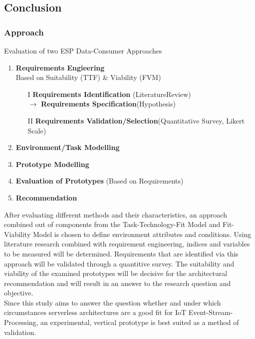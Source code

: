 \begin{minipage}{\textwidth}
    \subsection{Conclusion}
    
    \subsubsection{Approach}
    Evaluation of two ESP Data-Consumer Approaches
    \begin{enumerate}
        \item \textbf{Requirements Engieering}\\
            Based on Suitability (TTF) \& Viability (FVM)
            \begin{enumerate}
                \item[I] \textbf{Requirements Identification} (LiteratureReview)\\
                    $\longrightarrow$ \textbf{Requirements Specification}(Hypothesis)
                \item[II] \textbf{Requirements Validation/Selection}(Quantitative Survey, Likert Scale)
            \end{enumerate}
        \item \textbf{Environment/Task Modelling}
        \item \textbf{Prototype Modelling}
        \item \textbf{Evaluation of Prototypes} (Based on Requirements)
        \item \textbf{Recommendation}
    \end{enumerate}
    
    After evaluating different methods and their characteristics, an approach combined out of components from the Task-Technology-Fit Model and Fit-Viability Model is chosen to define environment attributes and conditions. Using literature research combined with requirement engineering, indices and variables to be measured will be determined. Requirements that are identified via this approach will be validated through a quantitive survey. The suitability and viability of the examined prototypes will be decisive for the architectural recommendation and will result in an answer to the research question and objective.\\
    Since this study aims to answer the question whether and under which circumstances serverless architectures are a good fit for IoT Event-Stream-Processing, an experimental, vertical prototype is best suited as a method of validation. 
    
\end{minipage}

